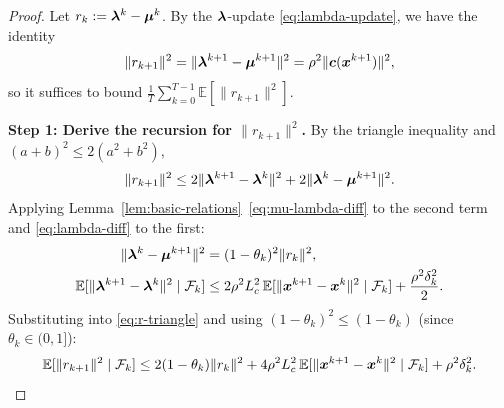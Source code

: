 \documentclass[10pt]{article}
\begin{document}
\begin{proof}
Let $r_k := \bm{\lambda}^k - \bm{\mu}^k$. By the $\bm{\lambda}$-update
\eqref{eq:lambda-update}, we have the identity
\begin{equation}\label{eq:r-feasibility}
  \|r_{k+1}\|^2 = \|\bm{\lambda}^{k+1} - \bm{\mu}^{k+1}\|^2 = \rho^2\|\bm{c}(\bm{x}^{k+1})\|^2,
\end{equation}
so it suffices to bound $\frac{1}{T}\sum_{k=0}^{T-1}\mathbb{E}[\|r_{k+1}\|^2]$.

\medskip\noindent\textbf{Step 1: Derive the recursion for $\|r_{k+1}\|^2$.}
By the triangle inequality and $(a+b)^2 \leq 2(a^2+b^2)$,
\begin{equation}\label{eq:r-triangle}
  \|r_{k+1}\|^2
  \leq 2\|\bm{\lambda}^{k+1} - \bm{\lambda}^k\|^2 + 2\|\bm{\lambda}^k - \bm{\mu}^{k+1}\|^2.
\end{equation}
Applying Lemma~\ref{lem:basic-relations}~\eqref{eq:mu-lambda-diff}
to the second term and \eqref{eq:lambda-diff} to the first:
\begin{align}
  \|\bm{\lambda}^k - \bm{\mu}^{k+1}\|^2 &= (1-\theta_k)^2\|r_k\|^2, \notag\\
  \mathbb{E}[\|\bm{\lambda}^{k+1}-\bm{\lambda}^k\|^2 \mid \mathcal{F}_k]
  &\leq 2\rho^2 L_c^2\,\mathbb{E}[\|\bm{x}^{k+1}-\bm{x}^k\|^2 \mid \mathcal{F}_k]
    + \frac{\rho^2\delta_k^2}{2}. \notag
\end{align}
Substituting into \eqref{eq:r-triangle} and using
$(1-\theta_k)^2 \leq (1-\theta_k)$ (since $\theta_k \in (0,1]$):
\begin{equation}\label{eq:r-recursion}
  \mathbb{E}[\|r_{k+1}\|^2 \mid \mathcal{F}_k]
  \leq 2(1-\theta_k)\|r_k\|^2
       + 4\rho^2 L_c^2\,\mathbb{E}[\|\bm{x}^{k+1}-\bm{x}^k\|^2 \mid \mathcal{F}_k]
       + \rho^2\delta_k^2.
\end{equation}


\end{proof}
\end{document}
